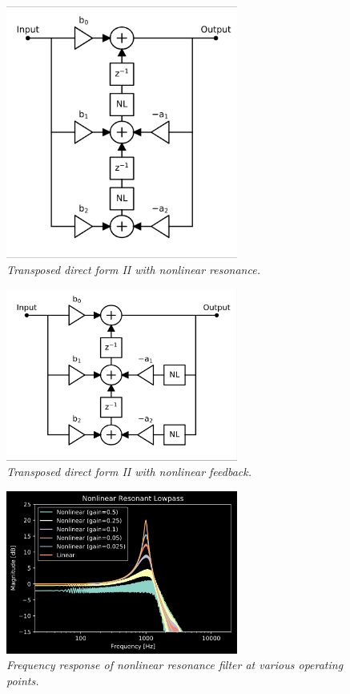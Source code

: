 \documentclass[twoside,a4paper]{article}
\begin{document}
%
\begin{figure}[h]
    \center
    \includegraphics[width=3in]{../NonlinearBiquad/Pics/NL-TDF-II-White.png}
    \caption{\label{nlbq}{\it Transposed direct form II with nonlinear resonance.}}
\end{figure}
%
\begin{figure}[h]
    \center
    \includegraphics[width=3in]{../NonlinearFeedback/Pics/NL2-TDF-II-White.png}
    \caption{\label{nlfd}{\it Transposed direct form II with nonlinear feedback.}}
\end{figure}
%
\begin{figure}[h]
    \center
    \includegraphics[width=3in]{../NonlinearBiquad/Pics/NL-LPF.png}
    \caption{\label{nlbq-lpf}{\it Frequency response of nonlinear resonance filter at
    various operating points.}}
\end{figure}
\end{document}
